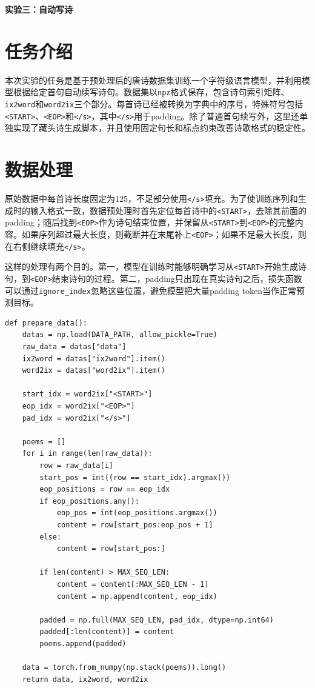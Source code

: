 \documentclass[11pt]{article}
\begin{document}
	\pagestyle{fancy}
	\chead{}
	
	\begin{center}
		{\LARGE \bf 实验三：自动写诗}
	\end{center}
	\begin{center}
		\large{}
	\end{center}

	\section{任务介绍}
	本次实验的任务是基于预处理后的唐诗数据集训练一个字符级语言模型，并利用模型根据给定首句自动续写诗句。数据集以\texttt{npz}格式保存，包含诗句索引矩阵、\texttt{ix2word}和\texttt{word2ix}三个部分。每首诗已经被转换为字典中的序号，特殊符号包括\texttt{<START>}、\texttt{<EOP>}和\texttt{</s>}，其中\texttt{</s>}用于padding。除了普通首句续写外，这里还单独实现了藏头诗生成脚本，并且使用固定句长和标点约束改善诗歌格式的稳定性。

	\section{数据处理}
	原始数据中每首诗长度固定为125，不足部分使用\texttt{</s>}填充。为了使训练序列和生成时的输入格式一致，数据预处理时首先定位每首诗中的\texttt{<START>}，去除其前面的padding；随后找到\texttt{<EOP>}作为诗句结束位置，并保留从\texttt{<START>}到\texttt{<EOP>}的完整内容。如果序列超过最大长度，则截断并在末尾补上\texttt{<EOP>}；如果不足最大长度，则在右侧继续填充\texttt{</s>}。

	这样的处理有两个目的。第一，模型在训练时能够明确学习从\texttt{<START>}开始生成诗句，到\texttt{<EOP>}结束诗句的过程。第二，padding只出现在真实诗句之后，损失函数可以通过\texttt{ignore\_index}忽略这些位置，避免模型把大量padding token当作正常预测目标。

	\begin{lstlisting}
def prepare_data():
    datas = np.load(DATA_PATH, allow_pickle=True)
    raw_data = datas["data"]
    ix2word = datas["ix2word"].item()
    word2ix = datas["word2ix"].item()

    start_idx = word2ix["<START>"]
    eop_idx = word2ix["<EOP>"]
    pad_idx = word2ix["</s>"]

    poems = []
    for i in range(len(raw_data)):
        row = raw_data[i]
        start_pos = int((row == start_idx).argmax())
        eop_positions = row == eop_idx
        if eop_positions.any():
            eop_pos = int(eop_positions.argmax())
            content = row[start_pos:eop_pos + 1]
        else:
            content = row[start_pos:]

        if len(content) > MAX_SEQ_LEN:
            content = content[:MAX_SEQ_LEN - 1]
            content = np.append(content, eop_idx)

        padded = np.full(MAX_SEQ_LEN, pad_idx, dtype=np.int64)
        padded[:len(content)] = content
        poems.append(padded)

    data = torch.from_numpy(np.stack(poems)).long()
    return data, ix2word, word2ix
	\end{lstlisting}
\end{document}
